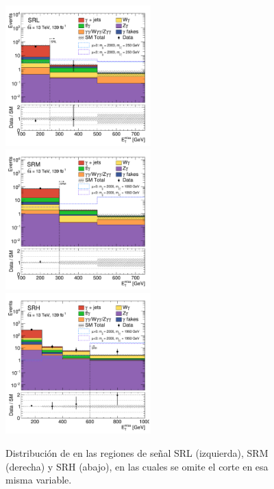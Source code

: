 \begin{figure}[!hb]
   \begin{center}
   \includegraphics[width=0.5\textwidth]{images/results/fr2_unblind/sigReg_SRL_fr2_met_et.pdf}%
   \includegraphics[width=0.5\textwidth]{images/results/fr2_unblind/sigReg_SRM_fr2_met_et.pdf}
   \includegraphics[width=0.5\textwidth]{images/results/fr2_unblind/sigReg_SRH_fr2_met_et.pdf}
   \caption{Distribución de \met en las regiones de señal SRL (izquierda), SRM (derecha) y SRH (abajo), en las cuales se omite el corte en esa misma variable.}
   \label{fig:met_n-1_SRL_SRM_SRH_fr2}
 \end{center}
\end{figure}



